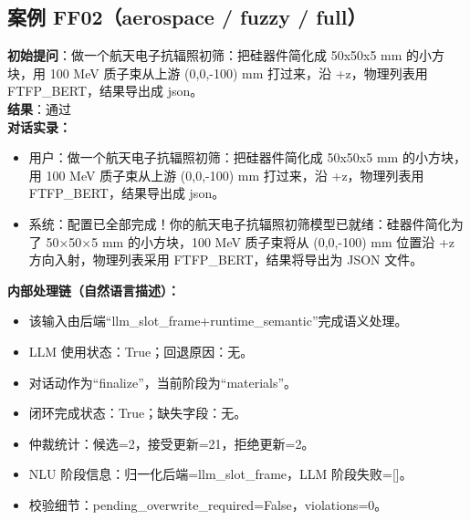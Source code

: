 \documentclass[11pt]{ctexart}
\begin{document}
\subsection{案例 FF02（aerospace / fuzzy / full）}
\textbf{初始提问}：做一个航天电子抗辐照初筛：把硅器件简化成 50x50x5 mm 的小方块，用 100 MeV 质子束从上游 (0,0,-100) mm 打过来，沿 +z，物理列表用 FTFP\_BERT，结果导出成 json。\\
\textbf{结果}：通过\\
\textbf{对话实录：}
\begin{itemize}
\item 用户：做一个航天电子抗辐照初筛：把硅器件简化成 50x50x5 mm 的小方块，用 100 MeV 质子束从上游 (0,0,-100) mm 打过来，沿 +z，物理列表用 FTFP\_BERT，结果导出成 json。
\item 系统：配置已全部完成！你的航天电子抗辐照初筛模型已就绪：硅器件简化为了 50×50×5 mm 的小方块，100 MeV 质子束将从 (0,0,-100) mm 位置沿 +z 方向入射，物理列表采用 FTFP\_BERT，结果将导出为 JSON 文件。
\end{itemize}
\textbf{内部处理链（自然语言描述）：}
\begin{itemize}
\item 该输入由后端“llm\_slot\_frame+runtime\_semantic”完成语义处理。
\item LLM 使用状态：True；回退原因：无。
\item 对话动作为“finalize”，当前阶段为“materials”。
\item 闭环完成状态：True；缺失字段：无。
\item 仲裁统计：候选=2，接受更新=21，拒绝更新=2。
\item NLU 阶段信息：归一化后端=llm\_slot\_frame，LLM 阶段失败=[]。
\item 校验细节：pending\_overwrite\_required=False，violations=0。
\end{itemize}
\end{document}
